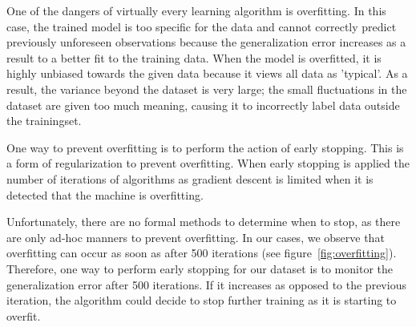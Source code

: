 One of the dangers of virtually every learning algorithm is overfitting. 
In this case, the trained model is too specific for the data and cannot correctly predict previously unforeseen observations because the generalization error increases as a result to a better fit to the training data. 
When the model is overfitted, it is highly unbiased towards the given data because it views all data as 'typical'.
As a result, the variance beyond the dataset is very large; the small fluctuations in the dataset are given too much meaning, causing it to incorrectly label data outside the trainingset.

One way to prevent overfitting is to perform the action of early stopping. 
This is a form of regularization to prevent overfitting. 
When early stopping is applied the number of iterations of algorithms as gradient descent is limited when it is detected that the machine is overfitting. 

Unfortunately, there are no formal methods to determine when to stop, as there are only ad-hoc manners to prevent overfitting. 
In our cases, we observe that overfitting can occur as soon as after 500 iterations (see figure~\ref{fig:overfitting}). 
Therefore, one way to perform early stopping for our dataset is to monitor the generalization error after 500 iterations.
If it increases as opposed to the previous iteration, the algorithm could decide to stop further training as it is starting to overfit.